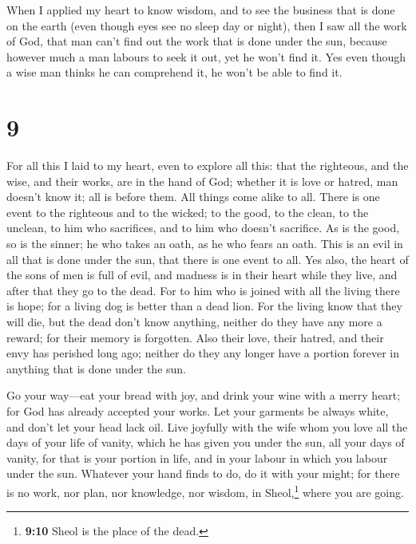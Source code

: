  When I applied my heart to know wisdom, and to see the
business that is done on the earth (even though eyes see no sleep day or
night),  then I saw all the work of God, that man can't
find out the work that is done under the sun, because however much a man
labours to seek it out, yet he won't find it. Yes even though a wise man
thinks he can comprehend it, he won't be able to find it.

\hypertarget{section-8}{%
\section{9}\label{section-8}}

 For all this I laid to my heart, even to explore all
this: that the righteous, and the wise, and their works, are in the hand
of God; whether it is love or hatred, man doesn't know it; all is before
them.  All things come alike to all. There is one event to
the righteous and to the wicked; to the good, to the clean, to the
unclean, to him who sacrifices, and to him who doesn't sacrifice. As is
the good, so is the sinner; he who takes an oath, as he who fears an
oath.  This is an evil in all that is done under the sun,
that there is one event to all. Yes also, the heart of the sons of men
is full of evil, and madness is in their heart while they live, and
after that they go to the dead.  For to him who is joined
with all the living there is hope; for a living dog is better than a
dead lion.  For the living know that they will die, but
the dead don't know anything, neither do they have any more a reward;
for their memory is forgotten.  Also their love, their
hatred, and their envy has perished long ago; neither do they any longer
have a portion forever in anything that is done under the sun.

 Go your way---eat your bread with joy, and drink your
wine with a merry heart; for God has already accepted your works.
 Let your garments be always white, and don't let your
head lack oil.  Live joyfully with the wife whom you love
all the days of your life of vanity, which he has given you under the
sun, all your days of vanity, for that is your portion in life, and in
your labour in which you labour under the sun.  Whatever
your hand finds to do, do it with your might; for there is no work, nor
plan, nor knowledge, nor wisdom, in Sheol,\footnote{\textbf{9:10} Sheol
  is the place of the dead.} where you are going.

